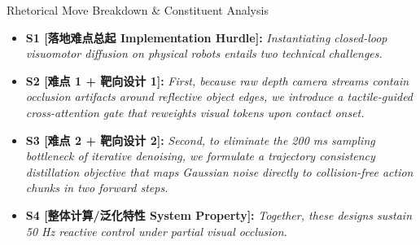 \begin{TipBox}{Rhetorical Move Breakdown \& Constituent Analysis}
\begin{itemize}[leftmargin=1.5em]
  \item \textbf{S1 [落地难点总起 Implementation Hurdle]:} \textit{Instantiating closed-loop visuomotor diffusion on physical robots entails two technical challenges.}\par{}
  \item \textbf{S2 [难点 1 + 靶向设计 1]:} \textit{First, because raw depth camera streams contain occlusion artifacts around reflective object edges, we introduce a tactile-guided cross-attention gate that reweights visual tokens upon contact onset.}\par{}
  \item \textbf{S3 [难点 2 + 靶向设计 2]:} \textit{Second, to eliminate the 200 ms sampling bottleneck of iterative denoising, we formulate a trajectory consistency distillation objective that maps Gaussian noise directly to collision-free action chunks in two forward steps.}\par{}
  \item \textbf{S4 [整体计算/泛化特性 System Property]:} \textit{Together, these designs sustain 50 Hz reactive control under partial visual occlusion.}\par{}
\end{itemize}
\end{TipBox}
\medskip
